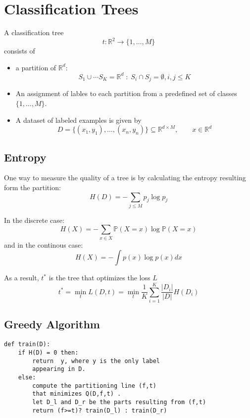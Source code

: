 \section{Classification Trees}
A classification tree
\noindent\begin{equation*}
    t: \mathbb{R}^2 \to \{1,\ldots, M\}
\end{equation*} consists of
\begin{itemize}
    \item a partition of $\mathbb{R}^d$:
          \noindent\begin{equation*}
              S_1\cup \cdots S_K = \mathbb{R}^d \;:\; S_i\cap S_j=\emptyset , i,j\leq K
          \end{equation*}
    \item An assignment of lables to each partition from a predefined set of classes $\{1,\ldots, M\}$.
    \item A dataset of labeled examples is given by
          \noindent\begin{equation*}
              D=\{(x_{1},y_{1}),\ldots,(x_{n},y_{n})\}\subseteq\mathbb{R}^{d\times M},\qquad x\in \mathbb{R}^d
          \end{equation*}
\end{itemize}

\subsection{Entropy}
One way to measure the quality of a tree is by calculating the entropy resulting form the partition:
\noindent\begin{equation*}
    H(D)=-\sum_{j\leq M}p_j\log p_j
\end{equation*}

In the discrete case:
\noindent\begin{equation*}
    H(X)=-\sum_{x\in X}\mathbb{P}(X=x)\log\mathbb{P}(X=x)
\end{equation*}
and in the continous case:
\noindent\begin{equation*}
    H(X)=-\int p(x)\log p(x) dx
\end{equation*}

As a result, $t^*$ is the tree that optimizes the loss $L$
\noindent\begin{equation*}
    t^* = \min_t L(D,t) =\min_t \frac{1}{K}\sum_{i=1}^{K} \frac{|D_i|}{|D|}H(D_i)
\end{equation*}

\subsection{Greedy Algorithm}

\begin{lstlisting}[style=bright_C++]
def train(D):
    if H(D) = 0 then:
        return  y, where y is the only label 
        appearing in D. 
    else:
        compute the partitioning line (f,t) 
        that minimizes Q(D,f,t) . 
        let D_l and D_r be the parts resulting from (f,t)
        return (f>=t)? train(D_l) : train(D_r)
\end{lstlisting}